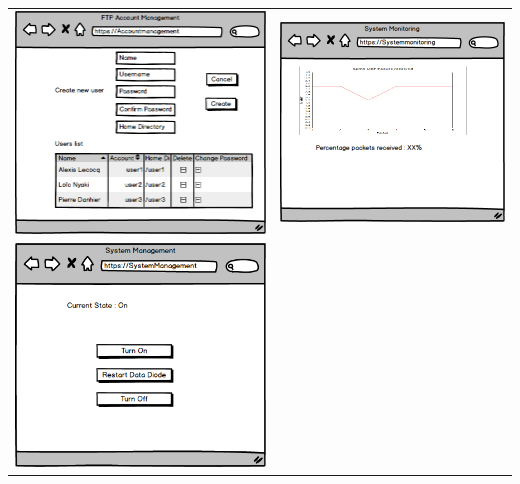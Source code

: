 \documentclass[a4paper,11pt]{article}
\begin{document}
\begin{center}
\begin{tabular}{cc}
\includegraphics[scale=0.45]{img/ftp.png} & \includegraphics[scale=0.5]{img/linkudp.png}\\
\includegraphics[scale=0.5]{img/switch.png} & \\



\end{tabular}
\end{center}
\end{document}
